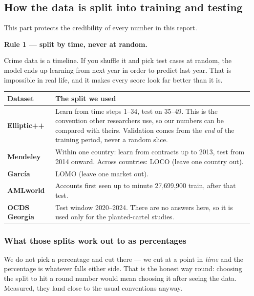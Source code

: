 \documentclass[11pt,a4paper]{article}
\begin{document}
\subsection{How the data is split into training and testing}

This part protects the credibility of every number in this report.

\begin{keybox}
\textbf{Rule 1 --- split by time, never at random.}

Crime data is a timeline. If you shuffle it and pick test cases at random, the
model ends up learning from next year in order to predict last year. That is
impossible in real life, and it makes every score look far better than it is.
\end{keybox}

\begin{longtable}{@{}p{3.4cm}p{12.1cm}@{}}
\toprule
\textbf{Dataset} & \textbf{The split we used} \\
\midrule
\endhead
\textbf{Elliptic++} & Learn from time steps 1--34, test on 35--49. This is the
convention other researchers use, so our numbers can be compared with theirs.
Validation comes from the \emph{end} of the training period, never a random
slice. \\
\textbf{Mendeley} & Within one country: learn from contracts up to 2013, test
from 2014 onward. Across countries: LOCO (leave one country out). \\
\textbf{García} & LOMO (leave one market out). \\
\textbf{AMLworld} & Accounts first seen up to minute 27{,}699{,}900 train, after
that test. \\
\textbf{OCDS Georgia} & Test window 2020--2024. There are no answers here, so it
is used only for the planted-cartel studies. \\
\bottomrule
\end{longtable}

\subsubsection*{What those splits work out to as percentages}

We do not pick a percentage and cut there --- we cut at a point in \emph{time}
and the percentage is whatever falls either side. That is the honest way round:
choosing the split to hit a round number would mean choosing it after seeing the
data. Measured, they land close to the usual conventions anyway.
\end{document}
